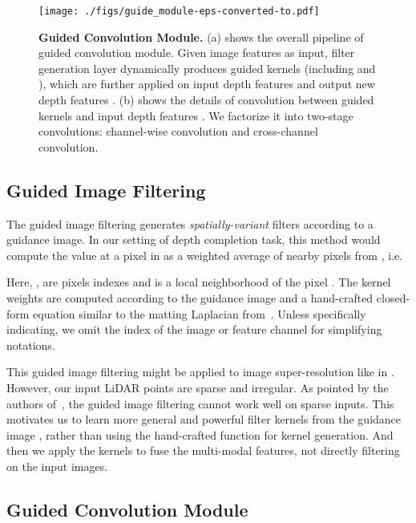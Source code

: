 \documentclass[journal]{IEEEtran}
\begin{document}
\begin{figure*}
\begin{center}
\texttt{[image: ./figs/guide\_module-eps-converted-to.pdf]}
\end{center}
   \caption{{\bf Guided Convolution Module.}
   (a) shows the overall pipeline of guided convolution module.
   Given image features  as input, filter generation layer dynamically produces guided kernels 
   (including  and ),
   which are further applied on input depth features  and output new depth features .
   (b) shows the details of convolution between guided kernels  and input depth features .
   We factorize it into two-stage convolutions: channel-wise convolution and cross-channel convolution.}
   \label{fig:guide_module}
\end{figure*}

\subsection{Guided Image Filtering}
\label{subsec:guided_filtering}
The guided image filtering\cite{guided_filter} generates \emph{spatially-variant} filters according to a guidance image.
In our setting of depth completion task, this method would compute the value at a pixel  in  as a weighted average of nearby pixels from , i.e.

Here, ,  are pixels indexes and  is a local neighborhood of the pixel .
The kernel weights  are computed according to the guidance image  and a hand-crafted closed-form equation similar to the matting Laplacian from~\cite{close_form_matting}.
Unless specifically indicating, we omit the index of the image or feature channel for simplifying notations.


This guided image filtering might be applied to image super-resolution like in \cite{joint_geodesic_upsampling}.
However, our input LiDAR points are sparse and irregular. 
As pointed by the authors of~\cite{guided_filter_conf}, the guided image filtering cannot work well on sparse inputs.
This motivates us to learn more general and powerful filter kernels from the guidance image , rather than using the hand-crafted function for kernel generation.
And then we apply the kernels to fuse the multi-modal features, not directly filtering on the input images.


\subsection{Guided Convolution Module}
\label{subsec:guide_module}
\end{document}
